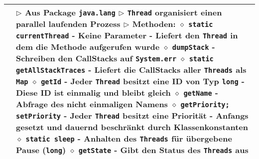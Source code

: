 \begin{longtable}{ | p{} p{} | }
	\makecell[l]{Klasse Thread} & \makecell[l]{
	$\rhd$ Aus Package \texttt{java.lang} \\
	$\rhd$ \texttt{Thread} organisiert einen parallel laufenden Prozess \\
	$\rhd$ Methoden: \\
	\hspace{0.4cm} $\diamond$ \texttt{static currentThread} \\
	\hspace{0.6cm} - Keine Parameter \\
	\hspace{0.6cm} - Liefert den \texttt{Thread} in dem die Methode aufgerufen wurde \\
	\hspace{0.4cm} $\diamond$ \texttt{dumpStack} \\
	\hspace{0.6cm} - Schreiben den CallStacks auf \texttt{System.err} \\
	\hspace{0.4cm} $\diamond$ \texttt{static getAllStackTraces} \\
	\hspace{0.6cm} - Liefert die CallStacks aller \texttt{Threads} als \texttt{Map}	\\
	\hspace{0.4cm} $\diamond$ \texttt{getId} \\
	\hspace{0.6cm} - Jeder \texttt{Thread} besitzt eine ID von Typ \texttt{long} \\
	\hspace{0.6cm} - Diese ID ist einmalig und bleibt gleich \\
	\hspace{0.4cm} $\diamond$ \texttt{getName} \\
	\hspace{0.6cm} - Abfrage des nicht einmaligen Namens \\
	\hspace{0.4cm} $\diamond$ \texttt{getPriority; setPriority} \\
	\hspace{0.6cm} - Jeder \texttt{Thread} besitzt eine Priorität \\
	\hspace{0.6cm} - Anfangs gesetzt und dauernd beschränkt durch Klassenkonstanten \\
	\hspace{0.4cm} $\diamond$ \texttt{static sleep} \\
	\hspace{0.6cm} - Anhalten des \texttt{Threads} für übergebene Pause (\texttt{long}) \\
	\hspace{0.4cm} $\diamond$ \texttt{getState} \\
	\hspace{0.6cm} - Gibt den Status des \texttt{Threads} aus \\
	 } \\ \hline


\end{longtable}
